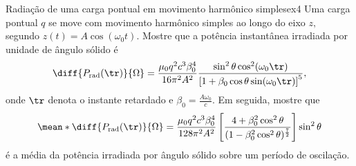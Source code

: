 \begin{exercício}{Radiação de uma carga pontual em movimento harmônico simples}{ex4}
    Uma carga pontual \(q\) se move com movimento harmônico simples ao longo do eixo \(z,\) segundo \(z(t) = A \cos(\omega_0 t).\) Mostre que a potência instantânea irradiada por unidade de ângulo sólido é
    \begin{equation*}
        \diff{P_\mathrm{rad}(\tr)}{\Omega} = \frac{\mu_0 q^2 c^3 \beta_0^4}{16 \pi^2 A^2} \frac{\sin^2 \theta \cos^2(\omega_0 \tr)}{\left[1 + \beta_0 \cos\theta \sin(\omega_0 \tr)\right]^5},
    \end{equation*}
    onde \(\tr\) denota o instante retardado e \(\beta_0 = \frac{A \omega_0}{c}.\) Em seguida, mostre que 
    \begin{equation*}
        \mean*{\diff{P_\mathrm{rad}(\tr)}{\Omega}} = \frac{\mu_0 q^2 c^3 \beta_0^4}{128 \pi^2 A^2} \left[\frac{4 + \beta_0^2 \cos^2\theta}{(1 - \beta_0^2 \cos^2 \theta)^{\frac72}}\right] \sin^2\theta
    \end{equation*}
    é a média da potência irradiada por ângulo sólido sobre um período de oscilação.
\end{exercício}
